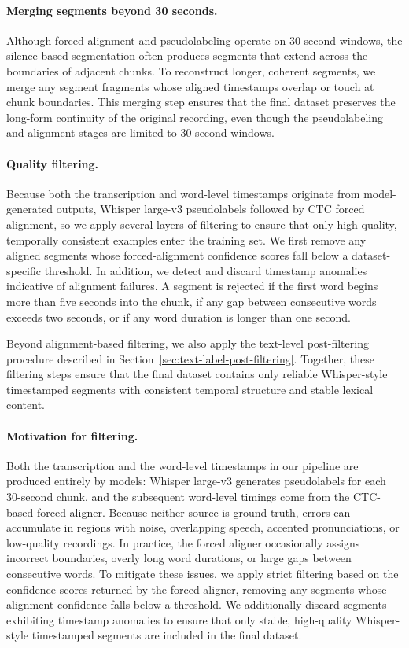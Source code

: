\documentclass{article}
\begin{document}
\paragraph{Merging segments beyond 30 seconds.}
Although forced alignment and pseudolabeling operate on 30-second windows, the silence-based segmentation often produces segments that extend across the boundaries of adjacent chunks. To reconstruct longer, coherent segments, we merge any segment fragments whose aligned timestamps overlap or touch at chunk boundaries. This merging step ensures that the final dataset preserves the long-form continuity of the original recording, even though the pseudolabeling and alignment stages are limited to 30-second windows.

\paragraph{Quality filtering.}
Because both the transcription and word-level timestamps originate from model-generated outputs, Whisper large-v3 pseudolabels followed by CTC forced alignment, so we apply several layers of filtering to ensure that only high-quality, temporally consistent examples enter the training set. We first remove any aligned segments whose forced-alignment confidence scores fall below a dataset-specific threshold. In addition, we detect and discard timestamp anomalies indicative of alignment failures. A segment is rejected if the first word begins more than five seconds into the chunk, if any gap between consecutive words exceeds two seconds, or if any word duration is longer than one second.

Beyond alignment-based filtering, we also apply the text-level post-filtering procedure described in Section~\ref{sec:text-label-post-filtering}. Together, these filtering steps ensure that the final dataset contains only reliable Whisper-style timestamped segments with consistent temporal structure and stable lexical content.

\paragraph{Motivation for filtering.}
Both the transcription and the word-level timestamps in our pipeline are produced entirely by models: Whisper large-v3 generates pseudolabels for each 30-second chunk, and the subsequent word-level timings come from the CTC-based forced aligner. Because neither source is ground truth, errors can accumulate in regions with noise, overlapping speech, accented pronunciations, or low-quality recordings. In practice, the forced aligner occasionally assigns incorrect boundaries, overly long word durations, or large gaps between consecutive words. To mitigate these issues, we apply strict filtering based on the confidence scores returned by the forced aligner, removing any segments whose alignment confidence falls below a threshold. We additionally discard segments exhibiting timestamp anomalies to ensure that only stable, high-quality Whisper-style timestamped segments are included in the final dataset.
\end{document}

